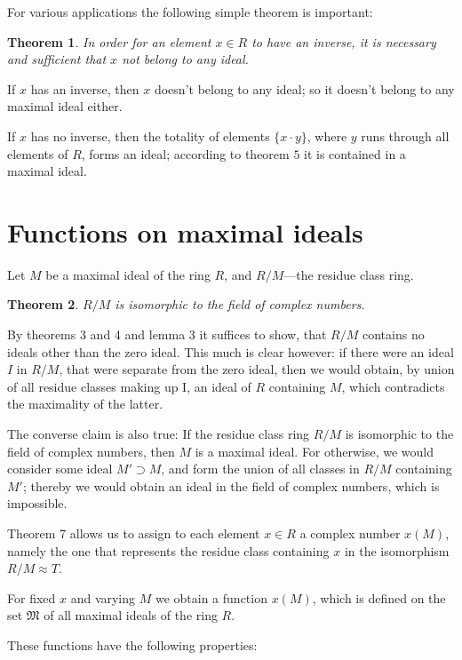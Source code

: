 \documentclass{article}
\newtheorem{theorem}{Theorem}
\theoremstyle{definition}
\begin{document}
For various applications the following simple theorem is important:
\begin{theorem}
  In order for an element $x\in R$ to have an inverse, it is necessary and sufficient that $x$ not belong to any ideal.
\end{theorem}

If $x$ has an inverse, then $x$ doesn't belong to any ideal; so it doesn't belong to any maximal ideal either.

If $x$ has no inverse, then the totality of elements $\{x\cdot y\}$, where $y$ runs through all elements of $R$, forms an ideal; according to theorem $5$ it is contained in a maximal ideal.

\section{Functions on maximal ideals}
Let $M$ be a maximal ideal of the ring $R$, and $R/M$---the residue class ring.
\begin{theorem}
  $R/M$ is isomorphic to the field of complex numbers.
\end{theorem}

By theorems 3 and 4 and lemma 3 it suffices to show, that $R/M$ contains no ideals other than the zero ideal. This much is clear however: if there were an ideal $I$ in $R/M$, that were separate from the zero ideal, then we would obtain, by union of all residue classes making up I, an ideal of $R$ containing $M$, which contradicts the maximality of the latter.

The converse claim is also true: If the residue class ring $R/M$ is isomorphic to the field of complex numbers, then $M$ is a maximal ideal. For otherwise, we would consider some ideal $M'\supset M$, and form the union of all classes in $R/M$ containing $M'$; thereby we would obtain an ideal in the field of complex numbers, which is impossible.

Theorem 7 allows us to assign to each element $x\in R$ a complex number $x(M)$, namely the one that represents the residue class containing $x$ in the isomorphism $R/M\approx T$.

For fixed $x$ and varying $M$ we obtain a function $x(M)$, which is defined on the set $\mathfrak{M}$ of all maximal ideals of the ring $R$.

These functions have the following properties:
\end{document}
